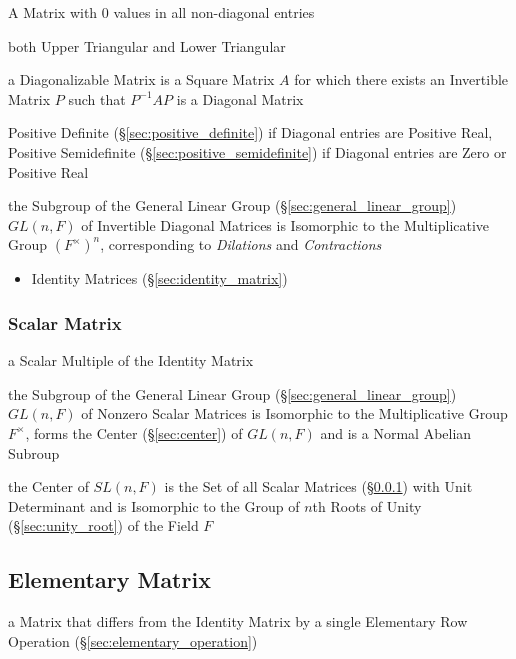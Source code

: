 A Matrix with $0$ values in all non-diagonal entries

both Upper Triangular and Lower Triangular

a Diagonalizable Matrix is a Square Matrix $A$ for which there exists an
Invertible Matrix $P$ such that $P^{-1}AP$ is a Diagonal Matrix

Positive Definite (\S\ref{sec:positive_definite}) if Diagonal entries are
Positive Real, Positive Semidefinite (\S\ref{sec:positive_semidefinite}) if
Diagonal entries are Zero or Positive Real

the Subgroup of the General Linear Group (\S\ref{sec:general_linear_group})
$GL(n,F)$ of Invertible Diagonal Matrices is Isomorphic to the Multiplicative
Group $(F^\times)^n$, corresponding to \emph{Dilations} and \emph{Contractions}

\begin{itemize}
  \item Identity Matrices (\S\ref{sec:identity_matrix})
\end{itemize}



\subsubsection{Scalar Matrix}\label{sec:scalar_matrix}

a Scalar Multiple of the Identity Matrix

the Subgroup of the General Linear Group (\S\ref{sec:general_linear_group})
$GL(n,F)$ of Nonzero Scalar Matrices is Isomorphic to the Multiplicative Group
$F^\times$, forms the Center (\S\ref{sec:center}) of $GL(n,F)$ and is a Normal
Abelian Subroup

the Center of $SL(n,F)$ is the Set of all Scalar Matrices
(\S\ref{sec:scalar_matrix}) with Unit Determinant and is Isomorphic to the
Group of $n$th Roots of Unity (\S\ref{sec:unity_root}) of the Field $F$



\subsection{Elementary Matrix}\label{sec:elementary_matrix}

a Matrix that differs from the Identity Matrix by a single Elementary Row
Operation (\S\ref{sec:elementary_operation})

